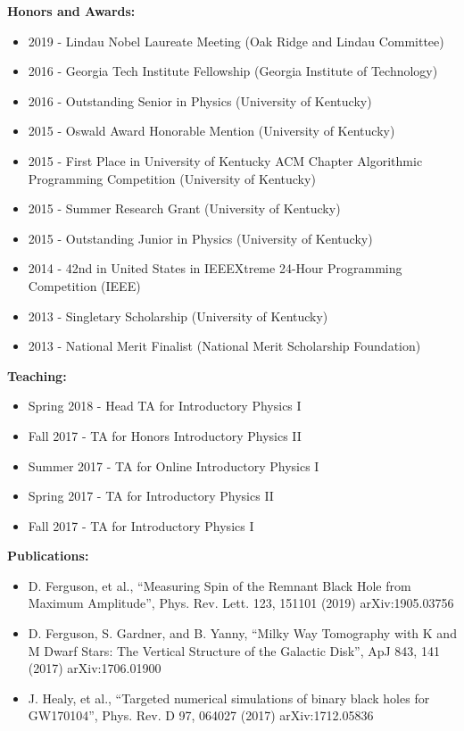 \documentclass[11pt]{article}
\begin{document}
\begin{flushleft}
  \textbf{Honors and Awards:}
  \begin{itemize}
  \item 2019 - Lindau Nobel Laureate Meeting (Oak Ridge and Lindau Committee)
  \item 2016 - Georgia Tech Institute Fellowship (Georgia Institute of Technology)
  \item 2016 - Outstanding Senior in Physics (University of Kentucky)
  \item 2015 - Oswald Award Honorable Mention (University of Kentucky)
  \item 2015 - First Place in University of Kentucky ACM Chapter Algorithmic Programming Competition (University of Kentucky)
  \item 2015 - Summer Research Grant (University of Kentucky)
  \item 2015 - Outstanding Junior in Physics (University of Kentucky)
  \item 2014 - 42nd in United States in IEEEXtreme 24-Hour Programming Competition (IEEE)
  \item 2013 - Singletary Scholarship (University of Kentucky)
  \item 2013 - National Merit Finalist (National Merit Scholarship Foundation)
  \end{itemize}
  
  \textbf{Teaching:}
  \begin{itemize}
  \item Spring 2018 - Head TA for Introductory Physics I
  \item Fall 2017 - TA for Honors Introductory Physics II
  \item Summer 2017 - TA for Online Introductory Physics I
  \item Spring 2017 - TA for Introductory Physics II
  \item Fall 2017 - TA for Introductory Physics I
  \end{itemize}

  \textbf{Publications:}
  \begin{itemize}
  \item D. Ferguson, et al., ``Measuring Spin of the Remnant Black Hole from Maximum Amplitude'', Phys. Rev. Lett. 123, 151101 (2019) arXiv:1905.03756
  \item D. Ferguson, S. Gardner, and B. Yanny, ``Milky Way Tomography with K and M Dwarf Stars: The Vertical Structure of the Galactic Disk'', ApJ 843, 141 (2017) arXiv:1706.01900
    \item J. Healy, et al., ``Targeted numerical simulations of binary black holes for GW170104'', Phys. Rev. D 97, 064027 (2017) arXiv:1712.05836
  \end{itemize}


\end{flushleft}
\end{document}
